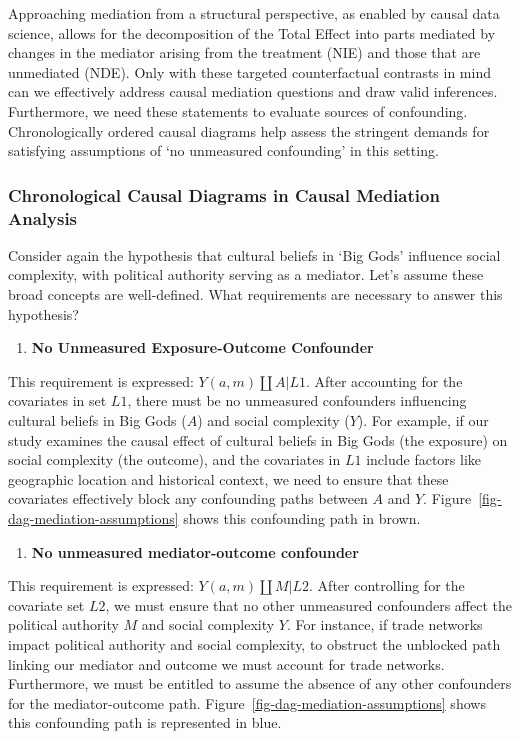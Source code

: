 \documentclass[
  singlecolumn,
  9pt]{article}
\providecommand{\tightlist}{%
  \setlength{\itemsep}{0pt}\setlength{\parskip}{0pt}}\usepackage{longtable,booktabs,array}
\begin{document}
Approaching mediation from a structural perspective, as enabled by
causal data science, allows for the decomposition of the Total Effect
into parts mediated by changes in the mediator arising from the
treatment (NIE) and those that are unmediated (NDE). Only with these
targeted counterfactual contrasts in mind can we effectively address
causal mediation questions and draw valid inferences. Furthermore, we
need these statements to evaluate sources of confounding.
Chronologically ordered causal diagrams help assess the stringent
demands for satisfying assumptions of `no unmeasured confounding' in
this setting.

\subsubsection{Chronological Causal Diagrams in Causal Mediation
Analysis}\label{chronological-causal-diagrams-in-causal-mediation-analysis}

Consider again the hypothesis that cultural beliefs in `Big Gods'
influence social complexity, with political authority serving as a
mediator. Let's assume these broad concepts are well-defined. What
requirements are necessary to answer this hypothesis?

\begin{enumerate}
\def\labelenumi{\arabic{enumi}.}
\tightlist
\item
  \textbf{No Unmeasured Exposure-Outcome Confounder}
\end{enumerate}

This requirement is expressed: \(Y(a,m) \coprod A | L1\). After
accounting for the covariates in set \(L1\), there must be no unmeasured
confounders influencing cultural beliefs in Big Gods (\(A\)) and social
complexity (\(Y\)). For example, if our study examines the causal effect
of cultural beliefs in Big Gods (the exposure) on social complexity (the
outcome), and the covariates in \(L1\) include factors like geographic
location and historical context, we need to ensure that these covariates
effectively block any confounding paths between \(A\) and \(Y\).
Figure~\ref{fig-dag-mediation-assumptions} shows this confounding path
in brown.

\begin{enumerate}
\def\labelenumi{\arabic{enumi}.}
\setcounter{enumi}{1}
\tightlist
\item
  \textbf{No unmeasured mediator-outcome confounder}
\end{enumerate}

This requirement is expressed: \(Y(a,m) \coprod M | L2\). After
controlling for the covariate set \(L2\), we must ensure that no other
unmeasured confounders affect the political authority \(M\) and social
complexity \(Y\). For instance, if trade networks impact political
authority and social complexity, to obstruct the unblocked path linking
our mediator and outcome we must account for trade networks.
Furthermore, we must be entitled to assume the absence of any other
confounders for the mediator-outcome path.
Figure~\ref{fig-dag-mediation-assumptions} shows this confounding path
is represented in blue.
\end{document}
